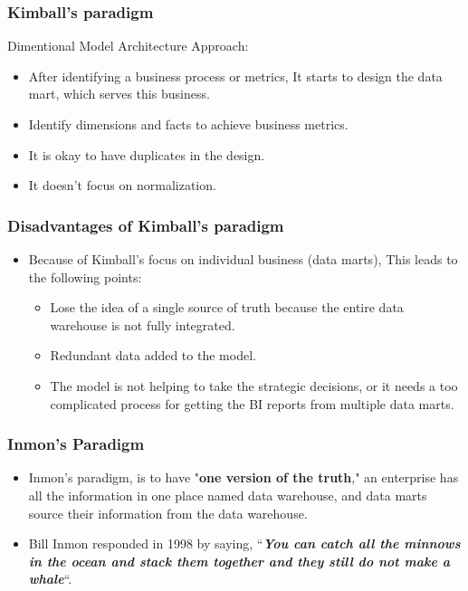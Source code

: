 \begin{frame}
	\frametitle{Kimball's paradigm}
	Dimentional Model Architecture Approach:
	\begin{itemize}[<+->]
		\item After identifying a business process or metrics, It starts to design the data mart, which serves this business.
		\item Identify dimensions and facts to achieve business metrics.
		\item It is okay to have duplicates in the design.
		\item It doesn't focus on normalization.
	\end{itemize}
	
\end{frame}
\begin{frame}
	\frametitle{Disadvantages of Kimball's paradigm}
	\begin{itemize}
		\item Because of Kimball's focus on individual business (data marts), This leads to the following points:
		\begin{itemize}[<+->]
			\item Lose the idea of a single source of truth because the entire data warehouse is not fully integrated.
			\item Redundant data added to the model.
			\item The model is not helping to take the strategic decisions, or it needs a too complicated process for getting the BI reports from multiple data marts. 
		\end{itemize}
	\end{itemize}
	
\end{frame}
\begin{frame}
	\frametitle{Inmon's Paradigm}
	\begin{itemize}[<+->]
		\item Inmon’s paradigm, is to have "\textbf{one version of the truth}," an enterprise has all the information in one place named data warehouse, and data marts source their information from the data warehouse.
	
		\item Bill Inmon responded in 1998 by saying,  “\textbf{\textit{You can catch all the minnows in the ocean and stack them together and they still do not make a whale}}“. 
	\end{itemize}
	
\end{frame}

